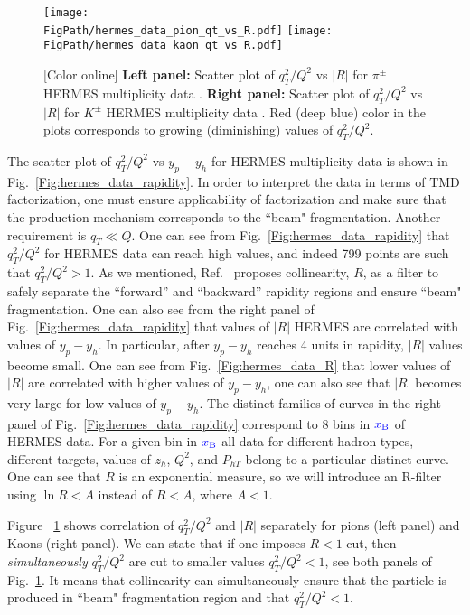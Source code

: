 \documentclass[final,3p,times,onecolumn,sort&compress,hidelinks]{elsarticle}
\newcommand{\xbj}{\ensuremath{{\cbl x_{\rm B}}}}
\newcommand\3[1]{\boldsymbol{#1}}
\newcommand{\cbl}{\color{blue}}
\newcommand*{\FigPath}{../Figs/}%
\begin{document}
\begin{figure}[htb!]
\centering
\texttt{[image: \\FigPath/hermes\_data\_pion\_qt\_vs\_R.pdf]}
\texttt{[image: \\FigPath/hermes\_data\_kaon\_qt\_vs\_R.pdf]}
\caption{\label{Fig:hermes_data_qt_vs_R}
[Color online] {\bf Left panel:} Scatter plot of $q_T^2/Q^2$ vs $|R|$ for $\pi^\pm$ HERMES multiplicity data . {\bf Right panel:} 
Scatter plot of $q_T^2/Q^2$ vs $|R|$ for $K^\pm$ HERMES multiplicity data . Red (deep blue) color in the plots corresponds to growing (diminishing) values of $q_T^2/Q^2$.
}
\end{figure}
The scatter plot of  $q_T^2/Q^2$ vs $y_p-y_h$ for HERMES multiplicity data is shown in Fig.~\ref{Fig:hermes_data_rapidity}. In order to interpret the data in terms of TMD factorization, one must ensure applicability of factorization and make sure that the production mechanism corresponds to the ``beam" fragmentation. Another requirement is $q_T \ll Q$. One can see from Fig.~\ref{Fig:hermes_data_rapidity} that  $q_T^2/Q^2$ for HERMES data can reach high values, and indeed 799 points are such that $q_T^2/Q^2>1$. As we mentioned, Ref.~\cite{Boglione:2016bph} proposes collinearity, $R$, as a filter to  safely separate the ``forward'' and ``backward'' rapidity regions and ensure ``beam" fragmentation. One can also see from the right panel of Fig.~\ref{Fig:hermes_data_rapidity}  that values of $|R|$ HERMES are correlated with values of $y_p-y_h$. In particular, after $y_p-y_h$ reaches 4 units in rapidity, $|R|$ values become small. One can see from Fig.~\ref{Fig:hermes_data_R} that lower values of $|R|$ are correlated with higher values of $y_p-y_h$, one can also see that $|R|$ becomes very large for low values of $y_p-y_h$. The distinct families of curves in the right panel of Fig.~\ref{Fig:hermes_data_rapidity} correspond to 8 bins in $\xbj$ of HERMES data. For a given bin in $\xbj$ all data for different hadron types, different targets, values of $z_h$, $Q^2$, and $P_{hT}$ belong to a particular distinct curve. One can see that $R$ is an exponential measure, so we will introduce an R-filter using $\ln R < A$ instead of $R < A$, where $A < 1$. 


Figure ~\ref{Fig:hermes_data_qt_vs_R} shows correlation of $q_T^2/Q^2$ and $|R|$ separately for pions (left panel) and Kaons (right panel).
We can state that if one imposes $R<1$-cut, then {\em simultaneously}  $q_T^2/Q^2$ are cut to smaller values $q_T^2/Q^2<1$, see both panels of Fig.~\ref{Fig:hermes_data_qt_vs_R}. It means that collinearity can simultaneously ensure that the particle is produced in ``beam" fragmentation region and that $q_T^2/Q^2<1$.
\end{document}
